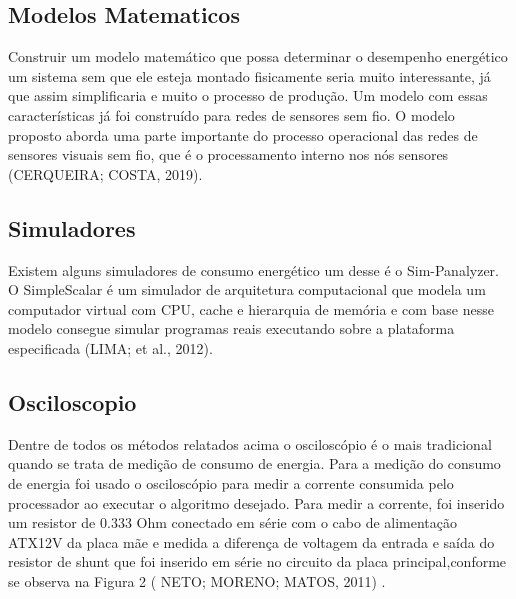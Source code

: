 \subsection{Modelos Matematicos}
Construir um modelo matemático que possa determinar o desempenho energético um sistema sem que ele esteja montado fisicamente seria muito interessante, já que assim simplificaria e muito o processo de produção. Um modelo com essas características já foi construído para redes de sensores sem fio. O modelo proposto aborda uma parte importante do processo operacional das redes de sensores visuais sem fio, que é o processamento interno nos nós sensores (CERQUEIRA; COSTA, 2019).

\subsection{Simuladores}
Existem alguns simuladores de consumo energético um desse é o Sim-Panalyzer.  O SimpleScalar é um simulador de arquitetura computacional que modela um computador virtual com CPU, cache e hierarquia de memória e com base nesse modelo consegue simular programas reais executando sobre a plataforma especificada (LIMA; et al., 2012).

\subsection{Osciloscopio }
Dentre de todos os métodos relatados acima o osciloscópio é o mais tradicional quando se trata de medição de consumo de energia. Para a medição do consumo de energia foi usado o osciloscópio para medir a corrente consumida pelo processador ao executar o algoritmo desejado. Para medir a corrente, foi inserido um resistor de 0.333 Ohm conectado em série com o cabo de alimentação ATX12V da placa mãe e medida a diferença de voltagem da entrada e saída do resistor de shunt que foi inserido em série no circuito da placa principal,conforme se observa na Figura 2 ( NETO; MORENO; MATOS, 2011) .

